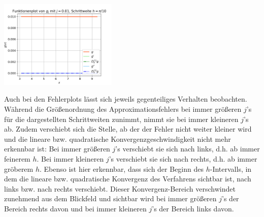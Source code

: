 \documentclass{scrartcl}
\begin{document}
{    \includegraphics[width=0.42\textwidth]{Grafiken/Funktionenplot_j001_Pi_Zehntel}\\
    \vspace{-0.2cm}

    \vspace{0.5cm}
  }

Auch bei den Fehlerplots lässt sich jeweils gegenteiliges Verhalten beobachten. Während die Größenordnung des Approximationsfehlers bei immer größeren $j$'s für die dargestellten Schrittweiten zunimmt, nimmt sie bei immer kleineren $j$'s ab. Zudem verschiebt sich die Stelle, ab der der Fehler nicht weiter kleiner wird und die lineare bzw. quadratische Konvergenzgeschwindigkeit nicht mehr erkennbar ist: Bei immer größeren $j$'s verschiebt sie sich nach links, d.h. ab immer feinerem $h$. Bei immer kleineren $j$'s verschiebt sie sich nach rechts, d.h. ab immer gröberem $h$. Ebenso ist hier erkennbar, dass sich der Beginn des $h$-Intervalls, in dem die lineare bzw. quadratische Konvergenz des Verfahrens sichtbar ist, nach links bzw. nach rechts verschiebt. Dieser Konvergenz-Bereich verschwindet zunehmend aus dem Blickfeld und sichtbar wird bei immer größeren $j$'s der Bereich rechts davon und bei immer kleineren $j$'s der Bereich links davon.
\end{document}
